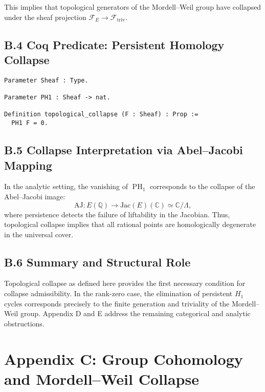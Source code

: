 \documentclass[11pt]{article}
\DeclareMathOperator{\PH}{PH}
\begin{document}
This implies that topological generators of the Mordell–Weil group have collapsed under the sheaf projection \( \mathcal{F}_E \to \mathcal{F}_{\mathrm{triv}} \).

\subsection*{B.4 Coq Predicate: Persistent Homology Collapse}
\begin{lstlisting}[language=Coq]
Parameter Sheaf : Type.

Parameter PH1 : Sheaf -> nat.

Definition topological_collapse (F : Sheaf) : Prop :=
  PH1 F = 0.
\end{lstlisting}

\subsection*{B.5 Collapse Interpretation via Abel–Jacobi Mapping}

In the analytic setting, the vanishing of \(\PH_1\) corresponds to the collapse of the Abel–Jacobi image:
\[
\mathrm{AJ}: E(\mathbb{Q}) \longrightarrow \mathrm{Jac}(E)(\mathbb{C}) \simeq \mathbb{C}/\Lambda,
\]
where persistence detects the failure of liftability in the Jacobian. Thus, topological collapse implies that all rational points are homologically degenerate in the universal cover.

\subsection*{B.6 Summary and Structural Role}

Topological collapse as defined here provides the first necessary condition for collapse admissibility. In the rank-zero case, the elimination of persistent \(H_1\) cycles corresponds precisely to the finite generation and triviality of the Mordell–Weil group. Appendix D and E address the remaining categorical and analytic obstructions.



\appendix
\section*{Appendix C: Group Cohomology and Mordell–Weil Collapse}
\end{document}

